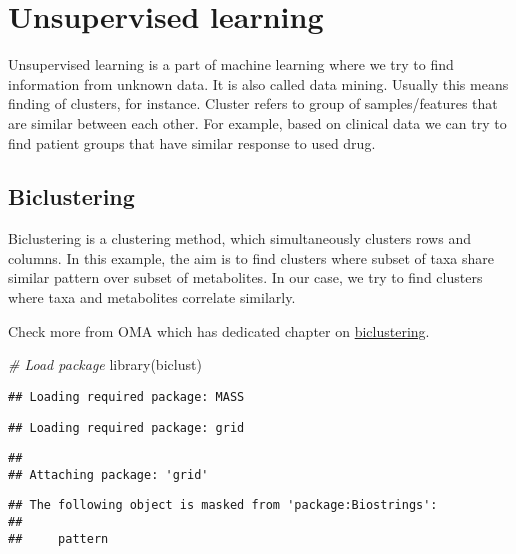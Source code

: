 \documentclass[
  oneside]{book}
\newenvironment{Shaded}{\begin{snugshade}}{\end{snugshade}}
\newcommand{\CommentTok}[1]{\textcolor[rgb]{0.56,0.35,0.01}{\textit{#1}}}
\newcommand{\FunctionTok}[1]{\textcolor[rgb]{0.00,0.00,0.00}{#1}}
\newcommand{\NormalTok}[1]{#1}
\begin{document}
\hypertarget{unsupervised-learning}{%
\section{Unsupervised learning}\label{unsupervised-learning}}

Unsupervised learning is a part of machine learning where we try to find information
from unknown data. It is also called data mining. Usually this means finding of
clusters, for instance. Cluster refers to group of samples/features that are similar
between each other. For example, based on clinical data we can try to find patient
groups that have similar response to used drug.

\hypertarget{biclustering}{%
\subsection{Biclustering}\label{biclustering}}

Biclustering is a clustering method, which simultaneously clusters rows and columns.
In this example, the aim is to find clusters where subset of taxa share similar
pattern over subset of metabolites. In our case, we try to find clusters where
taxa and metabolites correlate similarly.

Check more from OMA which has dedicated chapter on
\href{https://microbiome.github.io/OMA/biclustering.html}{biclustering}.

\begin{Shaded}
\begin{Highlighting}[]
\CommentTok{\# Load package}
\FunctionTok{library}\NormalTok{(biclust)}
\end{Highlighting}
\end{Shaded}

\begin{verbatim}
## Loading required package: MASS
\end{verbatim}

\begin{verbatim}
## Loading required package: grid
\end{verbatim}

\begin{verbatim}
## 
## Attaching package: 'grid'
\end{verbatim}

\begin{verbatim}
## The following object is masked from 'package:Biostrings':
## 
##     pattern
\end{verbatim}
\end{document}
